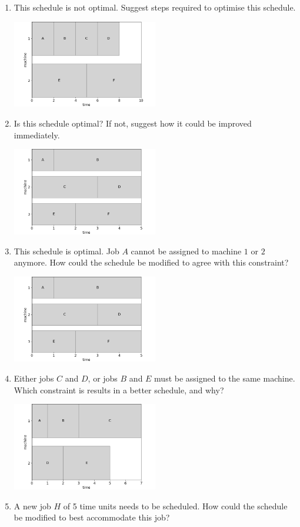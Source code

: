 \documentclass[10pt,a4paper]{article}
\begin{document}
\begin{enumerate}
	\item This schedule is not optimal. Suggest steps required to optimise this schedule.

	\includegraphics[width=0.5\textwidth]{figures/makespan_question1}\fbox{\rule{0.4\textwidth}{0pt}\rule{0pt}{4.7cm}}
	\item Is this schedule optimal? If not, suggest how it could be improved immediately.
	
	\includegraphics[width=0.5\textwidth]{figures/makespan_question2}\fbox{\rule{0.4\textwidth}{0pt}\rule{0pt}{4.7cm}}
	\item This schedule is optimal. Job $A$ cannot be assigned to machine $1$ or $2$ anymore. How could the schedule be modified to agree with this constraint?

	\includegraphics[width=0.5\textwidth]{figures/makespan_question3}\fbox{\rule{0.4\textwidth}{0pt}\rule{0pt}{4.7cm}}
	\item Either jobs $C$ and $D$, or jobs $B$ and $E$ must be assigned to the same machine. Which constraint is results in a better schedule, and why?

	\includegraphics[width=0.5\textwidth]{figures/makespan_question4}\fbox{\rule{0.4\textwidth}{0pt}\rule{0pt}{4.7cm}}
	\item A new job $H$ of 5 time units needs to be scheduled. How could the schedule be modified to best accommodate this job?


\end{enumerate}
\end{document}
